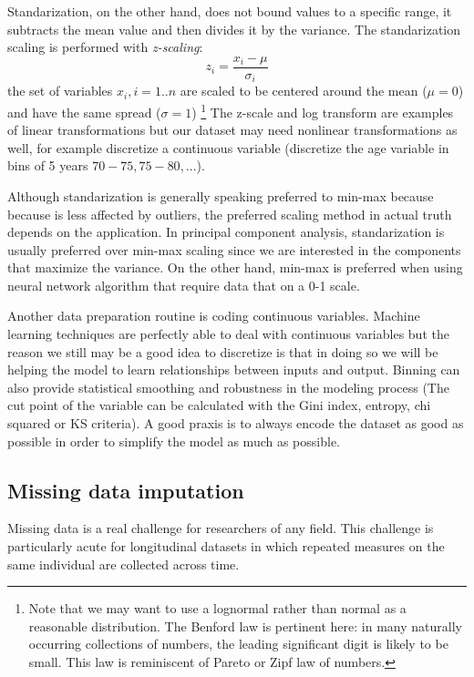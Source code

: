 \documentclass[11pt]{article}
\theoremstyle{definition}
\theoremstyle{remark}
\begin{document}
Standarization, on the other hand, does not bound values to a specific range, it subtracts the mean value and then divides it by the variance. 
The standarization scaling is performed with \emph{z-scaling}:
\begin{equation} \label{eq:scaling}
z_i = \frac{x_i -\mu}{\sigma_i}
\end{equation}
the set of variables $x_i, i=1..n$ are scaled to be centered around the mean ($\mu=0$) and have the same spread ($\sigma=1$) \footnote{Note that we may want to use a lognormal rather than normal as a reasonable distribution. The Benford law is pertinent here: in many naturally occurring collections of numbers, the leading significant digit is likely to be small. This law is reminiscent of Pareto or Zipf law of numbers.} %
The z-scale and log transform are examples of linear transformations but our dataset may need nonlinear transformations as well, for example discretize a continuous variable (discretize the age variable in bins of 5 years $70-75, 75-80, ...$). 

Although standarization is generally speaking preferred to min-max because because is less affected by outliers, the preferred scaling method in actual truth depends on the application. In principal component analysis, standarization is usually preferred over min-max scaling since we are interested in the components that maximize the variance.
On the other hand, min-max is preferred when using neural network algorithm that require data that on a 0-1 scale.

Another data preparation routine is coding continuous variables. Machine learning techniques are perfectly able to deal with continuous variables but the reason we still may be a good idea to discretize is that in doing so we will be helping the model to learn relationships between inputs and output. Binning can also provide statistical smoothing and robustness in the modeling process (The cut point of the variable can be calculated with the Gini index, entropy, chi squared or KS criteria).
A good praxis is to always encode the dataset as good as possible in order to simplify the model as much as possible.

\subsection{Missing data imputation}
\label{sse:miss}
Missing data is a real challenge for researchers of any field. This challenge is particularly acute for longitudinal datasets in which repeated measures on the same individual are collected across time. 
\end{document}

